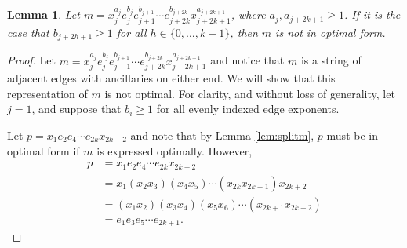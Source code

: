 \documentclass[12pt]{amsart}
\renewcommand{\geq}{\geqslant}
\theoremstyle{plain}
\newtheorem{lem}[theorem]{Lemma}
\theoremstyle{definition}
\begin{document}
\begin{lem}\label{lem:evens}
Let $m = x_j^{a_j} e_j^{b_j} e_{j+1}^{b_{j+1}} \cdots e_{j+2k}^{b_{j+2k}} x_{j+2k+1}^{a_{j+2k+1}}$, where $a_j, a_{j+2k+1} \geq 1$. If it is the case that $b_{j+2h+1} \geq 1$ for all $h \in \{0,\ldots,k-1\}$, then $m$ is not in optimal form.
\end{lem}

\begin{proof}
Let $m = x_j^{a_j} e_j^{b_j} e_{j+1}^{b_{j+1}} \cdots e_{j+2k}^{b_{j+2k}} x_{j+2k+1}^{a_{j+2k+1}}$ and notice that $m$ is a string of adjacent edges with ancillaries on either end. We will show that this representation of $m$ is not optimal. %
For clarity, and without loss of generality, let $j=1$, and suppose that $b_i \geq 1$ for all evenly indexed edge exponents. 

Let $p = x_1 e_2 e_{4} \cdots e_{2k} x_{2k+2}$ and note that %
by Lemma \ref{lem:splitm}, $p$ must be in optimal form if $m$ is expressed optimally. However, 
\begin{align*}
p &= 
x_1 e_2 e_{4} \cdots e_{2k} x_{2k+2} \\
&= x_1(x_2 x_3) (x_4 x_5) \cdots (x_{2k} x_{2k+1}) x_{2k+2} \\
&= (x_1x_2) (x_3 x_4) (x_5 x_6) \cdots (x_{2k+1} x_{2k+2}) \\
&= e_1 e_3 e_5  \cdots e_{2k+1}.
\end{align*}
\end{proof}




\end{document}
